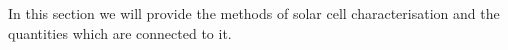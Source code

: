 In this section we will provide the methods of solar cell characterisation and the quantities which are connected to it. 
